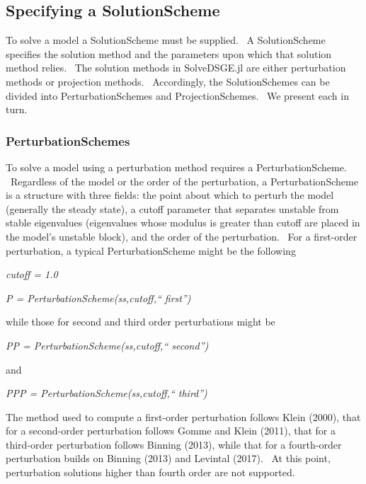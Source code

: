 \documentclass[notitlepage,11pt]{article}
\begin{document}
\subsection{Specifying a SolutionScheme}

To solve a model a SolutionScheme must be supplied. \ A SolutionScheme
specifies the solution method and the parameters upon which that solution
method relies. \ The solution methods in SolveDSGE.jl are either
perturbation methods or projection methods. \ Accordingly, the
SolutionSchemes can be divided into PerturbationSchemes and
ProjectionSchemes. \ We present each in turn.

\subsubsection{PerturbationSchemes}

To solve a model using a perturbation method requires a PerturbationScheme.
\ Regardless of the model or the order of the perturbation, a
PerturbationScheme is a structure with three fields: the point about which
to perturb the model (generally the steady state), a cutoff parameter that
separates unstable from stable eigenvalues (eigenvalues whose modulus is
greater than cutoff are placed in the model's unstable block), and the order
of the perturbation. \ For a first-order perturbation, a typical
PerturbationScheme might be the following

\bigskip

\textit{cutoff = 1.0}

\textit{P = PerturbationScheme(ss,cutoff,\textquotedblleft
first\textquotedblright )}

\bigskip

while those for second and third order perturbations might be

\bigskip

\textit{PP = PerturbationScheme(ss,cutoff,\textquotedblleft
second\textquotedblright )}

\bigskip

and

\bigskip

\textit{PPP = PerturbationScheme(ss,cutoff,\textquotedblleft
third\textquotedblright )}

\bigskip

The method used to compute a first-order perturbation follows Klein (2000),
that for a second-order perturbation follows Gomme and Klein (2011), that
for a third-order perturbation follows Binning (2013), while that for a
fourth-order perturbation builds on Binning (2013) and Levintal (2017). \ At
this point, perturbation solutions higher than fourth order are not
supported.
\end{document}

